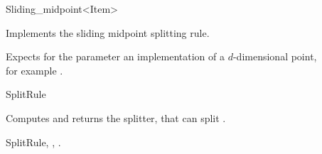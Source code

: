 

\begin{ccRefFunctionObjectClass}{Sliding_midpoint<Item>}  %


\begin{ccAdvanced}

\ccDefinition
Implements the sliding midpoint splitting rule.


\ccParameters

Expects for the parameter  an implementation 
of a $d$-dimensional point, \\
for example .

\ccIsModel

SplitRule

\ccTypes


\ccCreation
{}  %



{Computes and returns the splitter, that can split .}

\ccSeeAlso

SplitRule,
,
.

\end{ccAdvanced}

\end{ccRefFunctionObjectClass}


